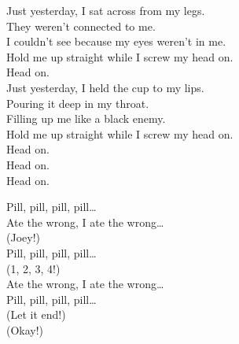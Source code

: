 
\label{album:float-along-fill-your-lungs}






Just yesterday, I sat across from my legs. \\
They weren't connected to me. \\
I couldn't see because my eyes weren't in me. \\
Hold me up straight while I screw my head on. \\

Head on. \\

Just yesterday, I held the cup to my lips. \\
Pouring it deep in my throat. \\
Filling up me like a black enemy. \\
Hold me up straight while I screw my head on. \\

Head on. \\
Head on. \\
Head on. \\


Pill, pill, pill, pill… \\

Ate the wrong, I ate the wrong… \\
(Joey!) \\

Pill, pill, pill, pill… \\

(1, 2, 3, 4!) \\

Ate the wrong, I ate the wrong… \\

Pill, pill, pill, pill… \\

(Let it end!) \\
(Okay!) \\


